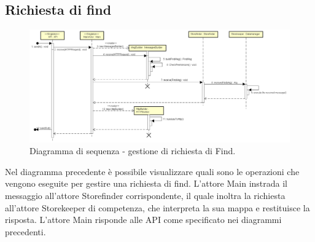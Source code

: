 \documentclass[a4paper]{article}
\begin{document}
        \subsection{Richiesta di find}
            \begin{figure} [H]
				\centering
				\includegraphics[width=\textwidth]{ST/seq/GestioneFind.png}
				\caption{Diagramma di sequenza - gestione di richiesta di Find.}
			\end{figure}
            Nel diagramma precedente è possibile visualizzare quali sono le operazioni che vengono eseguite per gestire una richiesta di find. L'attore Main instrada 
            il messaggio all'attore Storefinder corrispondente, il quale inoltra la richiesta all'attore Storekeeper di competenza, che interpreta la sua mappa e 
            restituisce la risposta. L'attore Main risponde alle API come specificato nei diagrammi precedenti.
            
\end{document}
